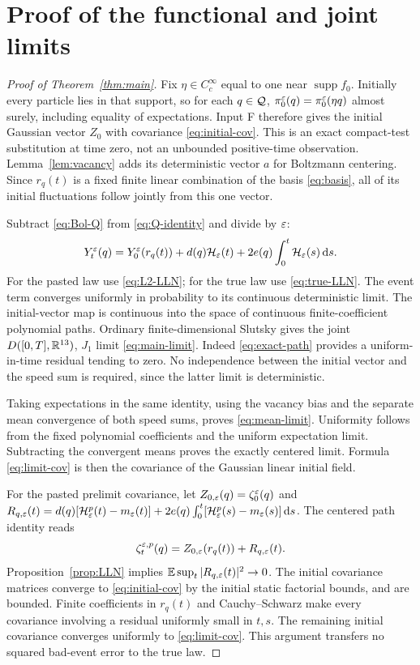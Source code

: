 \section{Proof of the functional and joint limits}\label{sec:process}
\begin{proof}[Proof of Theorem~\ref{thm:main}]
Fix $\eta\in C_c^\infty$ equal to one near $\operatorname{supp}f_0$.
Initially every particle lies in that support, so for each $q\in\mathcal Q$,
$\pi_0^\varepsilon(q)=\pi_0^\varepsilon(\eta q)$ almost surely, including equality of
expectations. Input F therefore gives the initial Gaussian vector $Z_0$
with covariance \eqref{eq:initial-cov}. This is an exact compact-test
substitution at time zero, not an unbounded positive-time observation.
Lemma~\ref{lem:vacancy} adds its deterministic vector $a$ for Boltzmann
centering. Since $r_q(t)$ is a fixed finite linear combination of the basis
\eqref{eq:basis}, all of its initial fluctuations follow jointly from
this one vector.

Subtract \eqref{eq:Bol-Q} from \eqref{eq:Q-identity} and divide by $\varepsilon$:
\begin{equation}\label{eq:exact-path}
 Y_t^\varepsilon(q)=Y_0^\varepsilon(r_q(t))
       +d(q)\mathcal H_\varepsilon(t)+2e(q)\int_0^t\mathcal H_\varepsilon(s)\,\mathrm d s.
\end{equation}
For the pasted law use \eqref{eq:L2-LLN}; for the true law use
\eqref{eq:true-LLN}. The event term converges uniformly in probability
to its continuous deterministic limit. The initial-vector map is continuous
into the space of continuous finite-coefficient polynomial paths. Ordinary
finite-dimensional Slutsky gives the joint $D([0,T],\mathbb R^{13})$, $J_1$
limit \eqref{eq:main-limit}. Indeed \eqref{eq:exact-path} provides a
uniform-in-time residual tending to zero. No independence between the
initial vector and the speed sum is required, since the latter limit
is deterministic.

Taking expectations in the same identity, using the vacancy bias and the
separate mean convergence of both speed sums, proves
\eqref{eq:mean-limit}. Uniformity follows from the fixed polynomial
coefficients and the uniform expectation limit. Subtracting the convergent
means proves the exactly centered limit. Formula \eqref{eq:limit-cov}
is then the covariance of the Gaussian linear initial field.

For the pasted prelimit covariance, let
$Z_{0,\varepsilon}(q)=\zeta_0^\varepsilon(q)$ and
$R_{q,\varepsilon}(t)=d(q)[\mathcal H_\varepsilon^p(t)-m_\varepsilon(t)]
+2e(q)\int_0^t[\mathcal H_\varepsilon^p(s)-m_\varepsilon(s)]\,\mathrm d s$.
The centered path identity reads
\[
 \zeta_t^{\varepsilon,p}(q)=Z_{0,\varepsilon}(r_q(t))+R_{q,\varepsilon}(t).
\]
Proposition~\ref{prop:LLN} implies
$\mathbb E\sup_t|R_{q,\varepsilon}(t)|^2\to0$.
The initial covariance matrices converge to \eqref{eq:initial-cov} by
the initial static factorial bounds, and are bounded. Finite coefficients
in $r_q(t)$ and Cauchy--Schwarz make every covariance involving a residual
uniformly small in $t,s$. The remaining initial covariance converges
uniformly to \eqref{eq:limit-cov}. This argument transfers no squared
bad-event error to the true law.


\end{proof}
